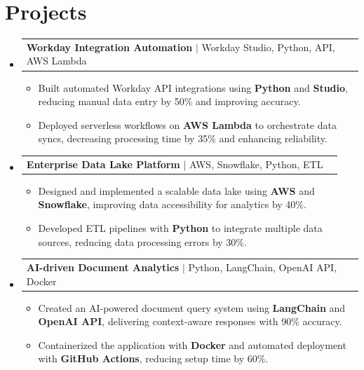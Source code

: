 \documentclass[letterpaper,11pt]{article}
\makeatletter
\newcommand{\resumeItem}[1]{
  \item\footnotesize{
    {#1 \vspace{-2pt}}
  }
}
\newcommand{\resumeProjectHeading}[2]{
    \item
    \begin{tabular*}{1.001\textwidth}{l@{\extracolsep{\fill}}r}
      \small#1 & \textbf{\small #2}\\
    \end{tabular*}\vspace{-7pt}
}
\newcommand{\resumeSubHeadingListStart}{\begin{itemize}[leftmargin=0pt, label={}]}
\newcommand{\resumeSubHeadingListEnd}{\end{itemize}}
\newcommand{\resumeItemListStart}{\begin{itemize}[leftmargin=*]}
\newcommand{\resumeItemListEnd}{\end{itemize}\vspace{-5pt}}
\makeatother
\begin{document}
\section{Projects}
    \vspace{-5pt}
    \resumeSubHeadingListStart

      \resumeProjectHeading
          {\textbf{Workday Integration Automation} $|$ Workday Studio, Python, API, AWS Lambda}{ }
        \resumeItemListStart
            \resumeItem{Built automated Workday API integrations using \textbf{Python} and \textbf{Studio}, reducing manual data entry by 50\% and improving accuracy.}
            \resumeItem{Deployed serverless workflows on \textbf{AWS Lambda} to orchestrate data syncs, decreasing processing time by 35\% and enhancing reliability.}
        \resumeItemListEnd
        \vspace{-12pt}

      \resumeProjectHeading
          {\textbf{Enterprise Data Lake Platform} $|$ AWS, Snowflake, Python, ETL}{ }
        \resumeItemListStart
            \resumeItem{Designed and implemented a scalable data lake using \textbf{AWS} and \textbf{Snowflake}, improving data accessibility for analytics by 40\%.}
            \resumeItem{Developed ETL pipelines with \textbf{Python} to integrate multiple data sources, reducing data processing errors by 30\%.}
        \resumeItemListEnd
        \vspace{-12pt}

      \resumeProjectHeading
          {\textbf{AI-driven Document Analytics} $|$ Python, LangChain, OpenAI API, Docker}{ }
        \resumeItemListStart
            \resumeItem{Created an AI-powered document query system using \textbf{LangChain} and \textbf{OpenAI API}, delivering context-aware responses with 90\% accuracy.}
            \resumeItem{Containerized the application with \textbf{Docker} and automated deployment with \textbf{GitHub Actions}, reducing setup time by 60\%.}
        \resumeItemListEnd

    \resumeSubHeadingListEnd
\end{document}
